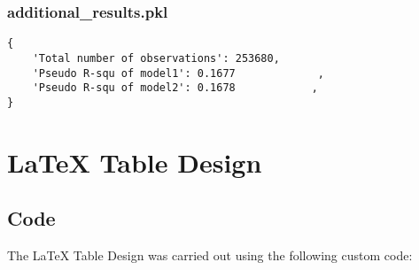 \documentclass[11pt]{article}
\begin{document}
\subsubsection*{additional\_results.pkl}

\begin{Verbatim}[tabsize=4]
{
    'Total number of observations': 253680,
    'Pseudo R-squ of model1': 0.1677             ,
    'Pseudo R-squ of model2': 0.1678            ,
}
\end{Verbatim}

\section{LaTeX Table Design} \subsection{Code}The LaTeX Table Design was carried out using the following custom code:
\end{document}
